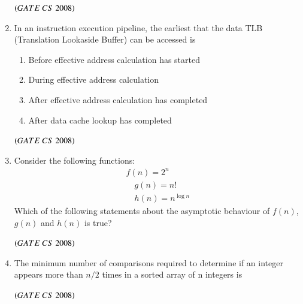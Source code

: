 \documentclass[journal]{IEEEtran}
\numberwithin{equation}{enumi}
\numberwithin{figure}{enumi}
\begin{document}
\begin{enumerate}
 \begin{enumerate}
\end{enumerate}
\hfill $\left(GATE\ CS\  2008\right)$

\item In an instruction execution pipeline, the earliest that the data TLB (Translation Lookaside Buffer) can be accessed is 
\begin{enumerate}
   \item Before effective address calculation has started
   \item During effective address calculation
   \item After effective address calculation has completed
   \item After data cache lookup has completed
\end{enumerate}
\hfill $\left(GATE\ CS\  2008\right)$
 

\item Consider the following functions:
\begin{align*}
f(n) = 2^n \\
\quad g(n) = n!\\
\quad h(n) = n^{\log n}
\end{align*}
Which of the following statements about the asymptotic behaviour of $f(n)$, $g(n)$ and $h(n)$ is true?
\begin{enumerate}
\end{enumerate}
\hfill $\left(GATE\ CS\  2008\right)$

\item The minimum number of comparisons required to determine if an integer appears more than $n/2$ times in a sorted array of n integers is
\begin{enumerate}
\end{enumerate}
\hfill $\left(GATE\ CS\  2008\right)$


\end{enumerate}
\end{document}
